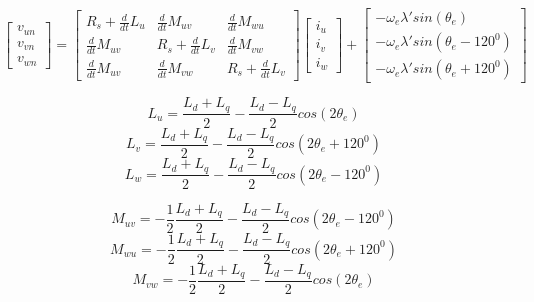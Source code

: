 \documentclass[11pt,a4paper]{article}
\begin{document}
\begin{equation}
    \begin{bmatrix}
        v_{un} \\v_{vn} \\v_{wn}
    \end{bmatrix}=
    \begin{bmatrix}
        R_{s}+\frac{d}{dt}L_{u} & \frac{d}{dt}M_{uv}      & \frac{d}{dt}M_{wu}      \\
        \frac{d}{dt}M_{uv}      & R_{s}+\frac{d}{dt}L_{v} & \frac{d}{dt}M_{vw}      \\
        \frac{d}{dt}M_{uv}      & \frac{d}{dt}M_{vw}      & R_{s}+\frac{d}{dt}L_{v}
    \end{bmatrix}
    \begin{bmatrix}
        i_{u} \\i_{v} \\i_{w}
    \end{bmatrix}+
    \begin{bmatrix}
        -\omega_{e} \lambda' sin(\theta_{e}) \\-\omega_{e} \lambda' sin(\theta_{e} - 120^0) \\-\omega_{e} \lambda' sin(\theta_{e}+120^0)
    \end{bmatrix}
\end{equation}

\begin{equation}
    L_{u}  =  \frac{L_{d}+ L_{q}}{2} - \frac{L_{d} - L_{q}}{2}cos(2\theta_{e})
\end{equation}
\begin{equation}
    L_{v}  =  \frac{L_{d}+ L_{q}}{2} - \frac{L_{d} - L_{q}}{2}cos(2\theta_{e} + 120^0)
\end{equation}
\begin{equation}
    L_{w}  =  \frac{L_{d}+ L_{q}}{2} - \frac{L_{d} - L_{q}}{2}cos(2\theta_{e} - 120^0)
\end{equation}

\begin{equation}
    M_{uv}  =  -\frac{1}{2} \frac{L_{d}+ L_{q}}{2} - \frac{L_{d} - L_{q}}{2}cos(2\theta_{e} - 120^0)
\end{equation}
\begin{equation}
    M_{wu}  =  -\frac{1}{2} \frac{L_{d}+ L_{q}}{2} - \frac{L_{d} - L_{q}}{2}cos(2\theta_{e} + 120^0)
\end{equation}
\begin{equation}
    M_{vw}  =  -\frac{1}{2} \frac{L_{d}+ L_{q}}{2} - \frac{L_{d} - L_{q}}{2}cos(2\theta_{e})
\end{equation}
\end{document}
